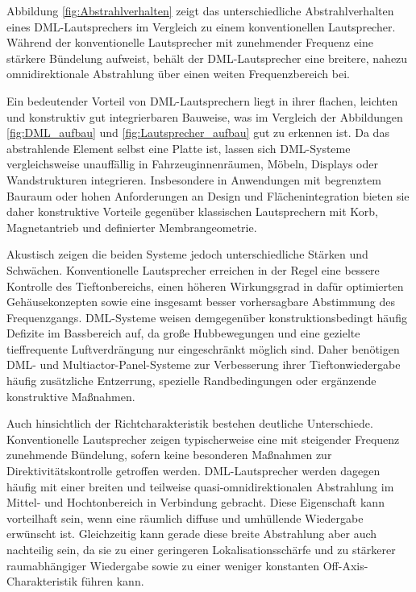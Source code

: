Abbildung \ref{fig:Abstrahlverhalten} zeigt das unterschiedliche Abstrahlverhalten eines DML-Lautsprechers im Vergleich zu einem konventionellen Lautsprecher. Während der konventionelle Lautsprecher mit zunehmender Frequenz eine stärkere Bündelung aufweist, behält der DML-Lautsprecher eine breitere, nahezu omnidirektionale Abstrahlung über einen weiten Frequenzbereich bei.

Ein bedeutender Vorteil von DML-Lautsprechern liegt in ihrer flachen, leichten und konstruktiv gut integrierbaren Bauweise, was im Vergleich der Abbildungen \ref{fig:DML_aufbau} und \ref{fig:Lautsprecher_aufbau} gut zu erkennen ist. Da das abstrahlende Element selbst eine Platte ist, lassen sich DML-Systeme vergleichsweise unauffällig in Fahrzeuginnenräumen, Möbeln, Displays oder Wandstrukturen integrieren. Insbesondere in Anwendungen mit begrenztem Bauraum oder hohen Anforderungen an Design und Flächenintegration bieten sie daher konstruktive Vorteile gegenüber klassischen Lautsprechern mit Korb, Magnetantrieb und definierter Membrangeometrie.

Akustisch zeigen die beiden Systeme jedoch unterschiedliche Stärken und Schwächen. Konventionelle Lautsprecher erreichen in der Regel eine bessere Kontrolle des Tieftonbereichs, einen höheren Wirkungsgrad in dafür optimierten Gehäusekonzepten sowie eine insgesamt besser vorhersagbare Abstimmung des Frequenzgangs.
DML-Systeme weisen demgegenüber konstruktionsbedingt häufig Defizite im Bassbereich auf, da große Hubbewegungen und eine gezielte tieffrequente Luftverdrängung nur eingeschränkt möglich sind. Daher benötigen DML- und Multiactor-Panel-Systeme zur Verbesserung ihrer Tieftonwiedergabe häufig zusätzliche Entzerrung, spezielle Randbedingungen oder ergänzende konstruktive Maßnahmen.

Auch hinsichtlich der Richtcharakteristik bestehen deutliche Unterschiede. Konventionelle Lautsprecher zeigen typischerweise eine mit steigender Frequenz zunehmende Bündelung, sofern keine besonderen Maßnahmen zur Direktivitätskontrolle getroffen werden. DML-Lautsprecher werden dagegen häufig mit einer breiten und teilweise quasi-omnidirektionalen Abstrahlung im Mittel- und Hochtonbereich in Verbindung gebracht. Diese Eigenschaft kann vorteilhaft sein, wenn eine räumlich diffuse und umhüllende Wiedergabe erwünscht ist. Gleichzeitig kann gerade diese breite Abstrahlung aber auch nachteilig sein, da sie zu einer geringeren Lokalisationsschärfe und zu stärkerer raumabhängiger Wiedergabe sowie zu einer weniger konstanten Off-Axis-Charakteristik führen kann.

